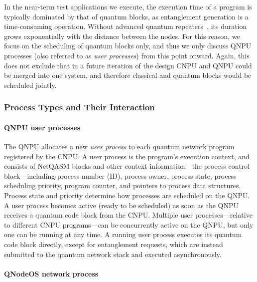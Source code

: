 In the near-term test applications we execute, the execution time of a program is typically dominated by that of quantum blocks, as entanglement generation is a time-consuming operation. Without advanced quantum repeaters~\cite{RepeaterSurvey}, its duration grows exponentially with the distance between the nodes. For this reason, we focus on the scheduling of quantum blocks only, and thus we only discuss \ac{QNPU} processes (also referred to as \emph{user processes}) from this point onward. Again, this does not exclude that in a future iteration of the design \ac{CNPU} and \ac{QNPU} could be merged into one system, and therefore classical and quantum blocks would be scheduled jointly.

\subsubsection{Process Types and Their Interaction}

\paragraph{QNPU user processes}

The \ac{QNPU} allocates a new \emph{user process} to each quantum network program registered by the \ac{CNPU}. A user process is the program's execution context, and consists of \ac{NetQASM} blocks and other context information---the process control block---including process number (ID), process owner, process state, process scheduling priority, program counter, and pointers to process data structures. Process state and priority determine how processes are scheduled on the \ac{QNPU}. A user process becomes active (ready to be scheduled) as soon as the \ac{QNPU} receives a quantum code block from the \ac{CNPU}. Multiple user processes---relative to different \ac{CNPU} programs---can be concurrently active on the \ac{QNPU}, but only one can be running at any time. A running user process executes its quantum code block directly, except for entanglement requests, which are instead submitted to the quantum network stack and executed asynchronously.

\paragraph{QNodeOS network process}

